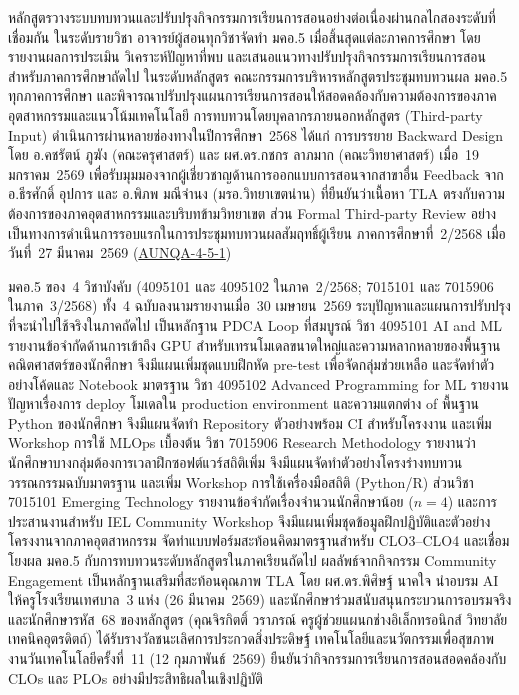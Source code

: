 หลักสูตรวางระบบทบทวนและปรับปรุงกิจกรรมการเรียนการสอนอย่างต่อเนื่องผ่านกลไกสองระดับที่เชื่อมกัน ในระดับรายวิชา อาจารย์ผู้สอนทุกวิชาจัดทำ มคอ.5 เมื่อสิ้นสุดแต่ละภาคการศึกษา โดยรายงานผลการประเมิน วิเคราะห์ปัญหาที่พบ และเสนอแนวทางปรับปรุงกิจกรรมการเรียนการสอนสำหรับภาคการศึกษาถัดไป ในระดับหลักสูตร คณะกรรมการบริหารหลักสูตรประชุมทบทวนผล มคอ.5 ทุกภาคการศึกษา และพิจารณาปรับปรุงแผนการเรียนการสอนให้สอดคล้องกับความต้องการของภาคอุตสาหกรรมและแนวโน้มเทคโนโลยี การทบทวนโดยบุคลากรภายนอกหลักสูตร (Third-party Input) ดำเนินการผ่านหลายช่องทางในปีการศึกษา~2568 ได้แก่ การบรรยาย Backward Design โดย อ.คชรัตน์ ภูฆัง (คณะครุศาสตร์) และ ผศ.ดร.กชกร ลาภมาก (คณะวิทยาศาสตร์) เมื่อ~19 มกราคม~2569 เพื่อรับมุมมองจากผู้เชี่ยวชาญด้านการออกแบบการสอนจากสาขาอื่น Feedback จาก อ.ธีรศักดิ์ อุปการ และ อ.พิภพ มณีจำนง (มรอ.วิทยาเขตน่าน) ที่ยืนยันว่าเนื้อหา TLA ตรงกับความต้องการของภาคอุตสาหกรรมและบริบทข้ามวิทยาเขต ส่วน Formal Third-party Review อย่างเป็นทางการดำเนินการรอบแรกในการประชุมทบทวนผลสัมฤทธิ์ผู้เรียน ภาคการศึกษาที่~2/2568 เมื่อวันที่~27 มีนาคม~2569 (\hyperlink{ref:AUNQA-4-5-1}{AUNQA-4-5-1})

มคอ.5 ของ~4 วิชาบังคับ (4095101 และ 4095102 ในภาค~2/2568; 7015101 และ 7015906 ในภาค~3/2568) ทั้ง~4 ฉบับลงนามรายงานเมื่อ~30 เมษายน~2569 ระบุปัญหาและแผนการปรับปรุงที่จะนำไปใช้จริงในภาคถัดไป เป็นหลักฐาน PDCA Loop ที่สมบูรณ์ วิชา 4095101 AI and ML รายงานข้อจำกัดด้านการเข้าถึง GPU สำหรับเทรนโมเดลขนาดใหญ่และความหลากหลายของพื้นฐานคณิตศาสตร์ของนักศึกษา จึงมีแผนเพิ่มชุดแบบฝึกหัด pre-test เพื่อจัดกลุ่มช่วยเหลือ และจัดทำตัวอย่างโค้ดและ Notebook มาตรฐาน วิชา 4095102 Advanced Programming for ML รายงานปัญหาเรื่องการ deploy โมเดลใน production environment และความแตกต่าง of พื้นฐาน Python ของนักศึกษา จึงมีแผนจัดทำ Repository ตัวอย่างพร้อม CI สำหรับโครงงาน และเพิ่ม Workshop การใช้ MLOps เบื้องต้น วิชา 7015906 Research Methodology รายงานว่านักศึกษาบางกลุ่มต้องการเวลาฝึกซอฟต์แวร์สถิติเพิ่ม จึงมีแผนจัดทำตัวอย่างโครงร่างทบทวนวรรณกรรมฉบับมาตรฐาน และเพิ่ม Workshop การใช้เครื่องมือสถิติ (Python/R) ส่วนวิชา 7015101 Emerging Technology รายงานข้อจำกัดเรื่องจำนวนนักศึกษาน้อย ($n=4$) และการประสานงานสำหรับ IEL Community Workshop จึงมีแผนเพิ่มชุดข้อมูลฝึกปฏิบัติและตัวอย่างโครงงานจากภาคอุตสาหกรรม จัดทำแบบฟอร์มสะท้อนคิดมาตรฐานสำหรับ CLO3--CLO4 และเชื่อมโยงผล มคอ.5 กับการทบทวนระดับหลักสูตรในภาคเรียนถัดไป ผลลัพธ์จากกิจกรรม Community Engagement เป็นหลักฐานเสริมที่สะท้อนคุณภาพ TLA โดย ผศ.ดร.พิศิษฐ์ นาคใจ นำอบรม AI ให้ครูโรงเรียนเทศบาล~3 แห่ง (26 มีนาคม~2569) และนักศึกษาร่วมสนับสนุนกระบวนการอบรมจริง และนักศึกษารหัส~68 ของหลักสูตร (คุณจิรกิตติ์ วราภรณ์ ครูผู้ช่วยแผนกช่างอิเล็กทรอนิกส์ วิทยาลัยเทคนิคอุตรดิตถ์) ได้รับรางวัลชนะเลิศการประกวดสิ่งประดิษฐ์ เทคโนโลยีและนวัตกรรมเพื่อสุขภาพ งานวันเทคโนโลยีครั้งที่~11 (12 กุมภาพันธ์~2569) ยืนยันว่ากิจกรรมการเรียนการสอนสอดคล้องกับ CLOs และ PLOs อย่างมีประสิทธิผลในเชิงปฏิบัติ

